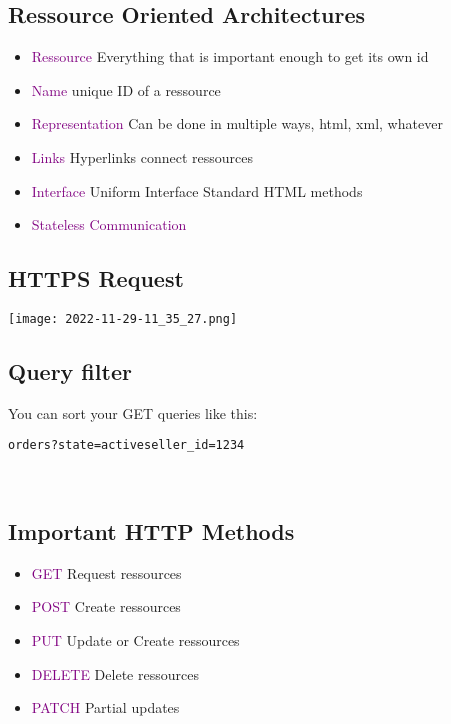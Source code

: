 \documentclass[main.tex,fontsize=6pt,paper=a4,paper=landscape,DIV=calc,]{scrartcl}
\begin{document}
\begin{multicols*}{4}
\subsection{Ressource Oriented Architectures}  

\begin{itemize}
\item \textcolor{purple}{Ressource}\newline
  Everything that is important enough to get its own id
\item \textcolor{purple}{Name}\newline
  unique ID of a ressource
\item \textcolor{purple}{Representation}\newline
  Can be done in multiple ways, html, xml, whatever
\item \textcolor{purple}{Links}\newline
  Hyperlinks connect ressources
\item \textcolor{purple}{Interface}\newline
  Uniform Interface\newline
  Standard HTML methods
\item \textcolor{purple}{Stateless Communication}
\end{itemize} 

\subsection{HTTPS Request}  
\texttt{[image: 2022-11-29-11\_35\_27.png]}

\subsection{Query filter}  
You can sort your GET queries like this: \newline
\begin{lstlisting}
orders?state=activeseller_id=1234
\end{lstlisting}
\, \newline

\subsection{Important HTTP Methods}  
\begin{itemize}
\item \textcolor{purple}{GET}\newline
  Request ressources
\item \textcolor{purple}{POST}\newline
  Create ressources
\item \textcolor{purple}{PUT}\newline
  Update or Create ressources
\item \textcolor{purple}{DELETE}\newline
  Delete ressources
\item \textcolor{purple}{PATCH}\newline
  Partial updates
\end{itemize} 


\end{multicols*}
\end{document}
